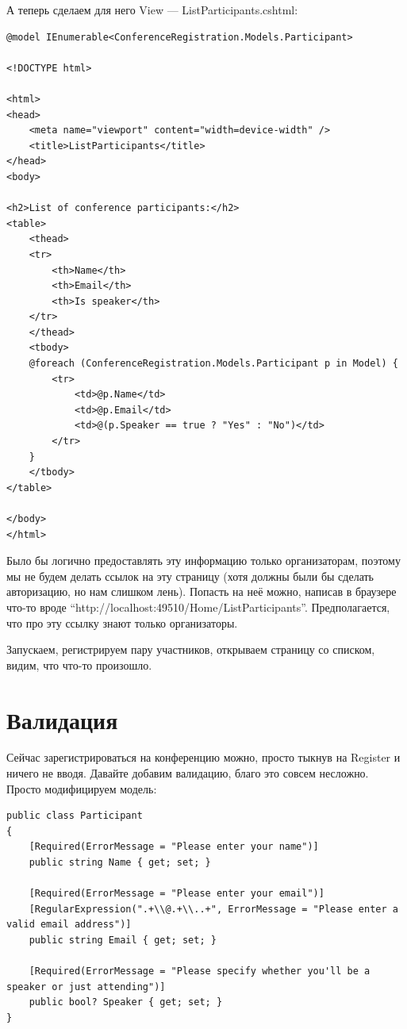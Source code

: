 \documentclass[a5paper]{article}
\begin{document}
А теперь сделаем для него View --- ListParticipants.cshtml:

\begin{verbatim}
@model IEnumerable<ConferenceRegistration.Models.Participant>

<!DOCTYPE html>

<html>
<head>
    <meta name="viewport" content="width=device-width" />
    <title>ListParticipants</title>
</head>
<body>

<h2>List of conference participants:</h2>
<table>
    <thead>
    <tr>
        <th>Name</th>
        <th>Email</th>
        <th>Is speaker</th>
    </tr>
    </thead>
    <tbody>
    @foreach (ConferenceRegistration.Models.Participant p in Model) {
        <tr>
            <td>@p.Name</td>
            <td>@p.Email</td>
            <td>@(p.Speaker == true ? "Yes" : "No")</td>
        </tr>
    }
    </tbody>
</table>

</body>
</html>
\end{verbatim}

Было бы логично предоставлять эту информацию только организаторам, поэтому мы не будем делать ссылок на эту страницу (хотя должны были бы сделать авторизацию, но нам слишком лень). Попасть на неё можно, написав в браузере что-то вроде ``http://localhost:49510/Home/ListParticipants''.
Предполагается, что про эту ссылку знают только организаторы.

Запускаем, регистрируем пару участников, открываем страницу со списком, видим, что что-то произошло.

\section{Валидация}

Сейчас зарегистрироваться на конференцию можно, просто тыкнув на Register и ничего не вводя. Давайте добавим валидацию, благо это совсем несложно. Просто модифицируем модель:

\begin{verbatim}
public class Participant
{
    [Required(ErrorMessage = "Please enter your name")]
    public string Name { get; set; }

    [Required(ErrorMessage = "Please enter your email")]
    [RegularExpression(".+\\@.+\\..+", ErrorMessage = "Please enter a valid email address")]
    public string Email { get; set; }

    [Required(ErrorMessage = "Please specify whether you'll be a speaker or just attending")]
    public bool? Speaker { get; set; }
}
\end{verbatim}
\end{document}
